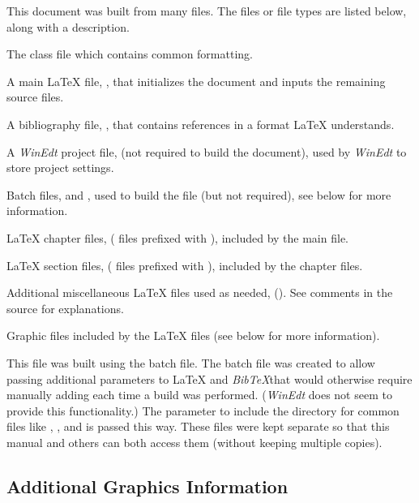 This document was built from many files.  The files or file types are listed below, along with a description.
    \begin{bulletedlist}
        \item The class file  which contains common formatting.
        \item A main \LaTeX{} file, , that initializes the document and inputs the remaining source files.
        \item A bibliography file, , that contains references in a format \LaTeX{} understands.
        \item A \emph{WinEdt} project file,  (not required to build the document), used by \emph{WinEdt} to store project settings.
        \item Batch files,  and , used to build the file (but not required), see below for more information.
        \item \LaTeX{} chapter files, ( files prefixed with ), included by the main file.
        \item \LaTeX{} section files, ( files prefixed with ), included by the chapter files.
        \item Additional miscellaneous \LaTeX{} files used as needed, ().  See comments in the source for explanations.
        \item Graphic files included by the \LaTeX{} files (see below for more information).
    \end{bulletedlist}

This file was built using the  batch file.  The batch file was created to allow passing additional parameters to \LaTeX{} and \emph{BibTeX}\@ that would otherwise require manually adding each time a build was performed.  (\emph{WinEdt} does not seem to provide this functionality.)  The parameter to include the directory for common files like , , and  is passed this way.  These files were kept separate so that this manual and others can both access them (without keeping multiple copies).

    \subsection*{Additional Graphics Information}

